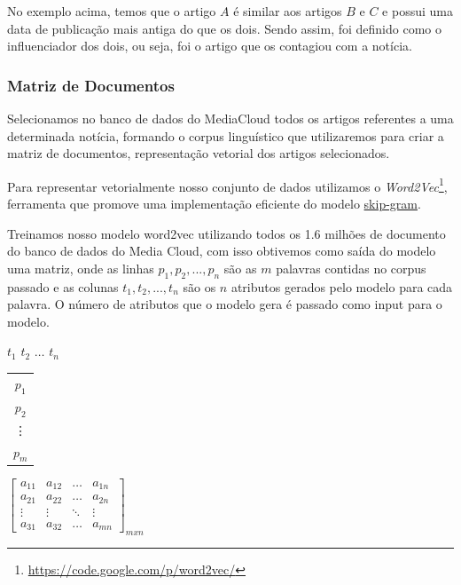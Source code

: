 \documentclass[a4paper,12pt]{article}
\begin{document}
No exemplo acima, temos que o artigo $A$ é similar aos artigos $B$ e $C$ e possui uma data de publicação mais antiga do que os dois. 
Sendo assim, foi definido como o influenciador dos dois, ou seja, foi o artigo que os contagiou com a notícia.

\subsubsection{Matriz de Documentos}

Selecionamos no banco de dados do MediaCloud todos os artigos referentes a uma determinada notícia, formando o corpus linguístico que 
utilizaremos para criar a matriz de documentos, representação vetorial dos artigos selecionados.

Para representar vetorialmente nosso conjunto de dados utilizamos o \textit{Word2Vec}\footnote[1]{\url{https://code.google.com/p/word2vec/}},
ferramenta que promove uma implementação eficiente do modelo \hyperref[sec:nlp]{skip-gram}.

Treinamos nosso modelo word2vec utilizando todos os 1.6 milhões de documento do banco de dados do Media Cloud,
com isso obtivemos
como saída do modelo uma matriz, onde as linhas $p_{1},p_{2},...,p_{n}$ são as $m$ palavras contidas no corpus passado e as colunas $t_{1},t_{2},...,t_{n}$
são os $n$ atributos gerados pelo modelo para cada palavra. O número de atributos que o modelo gera é passado como input para o modelo.
 
 \begin{center}
 \hspace{0.2cm}$t_{1}$ \hspace{0.5cm} $t_{2}$ \hspace{0.3cm} $\hdots$ \hspace{0.4cm}$t_{n}$
 
 \vspace{0.2cm}
 
\begin{tabular}{c}
   $p_{1}$ \\
   $p_{2}$ \\
   \vdots\\
   $p_{m}$
 \end{tabular}
 $
 \begin{bmatrix}
  a_{11} & a_{12} & \hdots & a_{1n}\\
  a_{21} & a_{22} & \hdots & a_{2n}\\
  \vdots & \vdots & \ddots & \vdots\\
  a_{31} & a_{32} & \hdots & a_{mn}
 \end{bmatrix}_{mxn}
$

\end{center}
\end{document}
